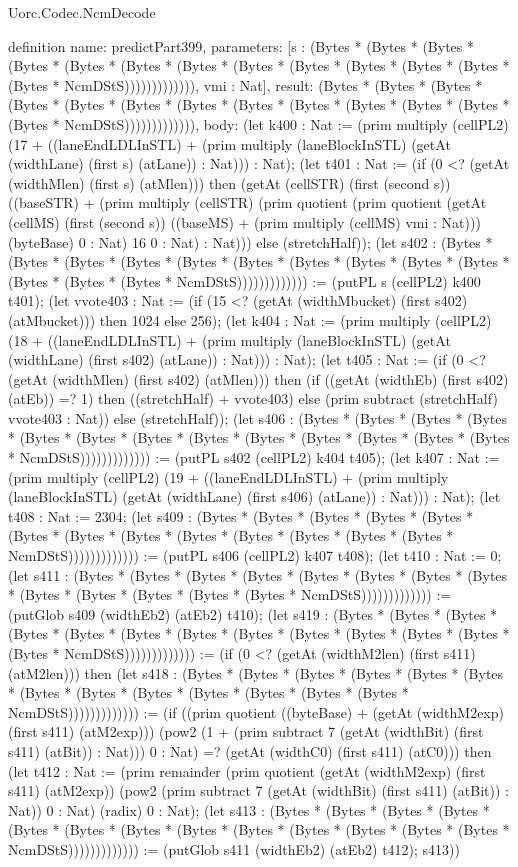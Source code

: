 \begin{lexlean}{Uorc.Codec.NcmDecode}
\begin{semanticmodule}
definition{
  name: predictPart399,
  parameters: [s : (Bytes * (Bytes * (Bytes * (Bytes * (Bytes * (Bytes * (Bytes * (Bytes * (Bytes * (Bytes * (Bytes * (Bytes * (Bytes * NcmDStS))))))))))))), vmi : Nat],
  result: (Bytes * (Bytes * (Bytes * (Bytes * (Bytes * (Bytes * (Bytes * (Bytes * (Bytes * (Bytes * (Bytes * (Bytes * (Bytes * NcmDStS))))))))))))),
  body: (let k400 : Nat := (prim multiply (cellPL2) (17 + ((laneEndLDLInSTL) + (prim multiply (laneBlockInSTL) (getAt (widthLane) (first s) (atLane)) : Nat))) : Nat); (let t401 : Nat := (if (0 <? (getAt (widthMlen) (first s) (atMlen))) then (getAt (cellSTR) (first (second s)) ((baseSTR) + (prim multiply (cellSTR) (prim quotient (prim quotient (getAt (cellMS) (first (second s)) ((baseMS) + (prim multiply (cellMS) vmi : Nat))) (byteBase) 0 : Nat) 16 0 : Nat) : Nat))) else (stretchHalf)); (let s402 : (Bytes * (Bytes * (Bytes * (Bytes * (Bytes * (Bytes * (Bytes * (Bytes * (Bytes * (Bytes * (Bytes * (Bytes * (Bytes * NcmDStS))))))))))))) := (putPL s (cellPL2) k400 t401); (let vvote403 : Nat := (if (15 <? (getAt (widthMbucket) (first s402) (atMbucket))) then 1024 else 256); (let k404 : Nat := (prim multiply (cellPL2) (18 + ((laneEndLDLInSTL) + (prim multiply (laneBlockInSTL) (getAt (widthLane) (first s402) (atLane)) : Nat))) : Nat); (let t405 : Nat := (if (0 <? (getAt (widthMlen) (first s402) (atMlen))) then (if ((getAt (widthEb) (first s402) (atEb)) =? 1) then ((stretchHalf) + vvote403) else (prim subtract (stretchHalf) vvote403 : Nat)) else (stretchHalf)); (let s406 : (Bytes * (Bytes * (Bytes * (Bytes * (Bytes * (Bytes * (Bytes * (Bytes * (Bytes * (Bytes * (Bytes * (Bytes * (Bytes * NcmDStS))))))))))))) := (putPL s402 (cellPL2) k404 t405); (let k407 : Nat := (prim multiply (cellPL2) (19 + ((laneEndLDLInSTL) + (prim multiply (laneBlockInSTL) (getAt (widthLane) (first s406) (atLane)) : Nat))) : Nat); (let t408 : Nat := 2304; (let s409 : (Bytes * (Bytes * (Bytes * (Bytes * (Bytes * (Bytes * (Bytes * (Bytes * (Bytes * (Bytes * (Bytes * (Bytes * (Bytes * NcmDStS))))))))))))) := (putPL s406 (cellPL2) k407 t408); (let t410 : Nat := 0; (let s411 : (Bytes * (Bytes * (Bytes * (Bytes * (Bytes * (Bytes * (Bytes * (Bytes * (Bytes * (Bytes * (Bytes * (Bytes * (Bytes * NcmDStS))))))))))))) := (putGlob s409 (widthEb2) (atEb2) t410); (let s419 : (Bytes * (Bytes * (Bytes * (Bytes * (Bytes * (Bytes * (Bytes * (Bytes * (Bytes * (Bytes * (Bytes * (Bytes * (Bytes * NcmDStS))))))))))))) := (if (0 <? (getAt (widthM2len) (first s411) (atM2len))) then (let s418 : (Bytes * (Bytes * (Bytes * (Bytes * (Bytes * (Bytes * (Bytes * (Bytes * (Bytes * (Bytes * (Bytes * (Bytes * (Bytes * NcmDStS))))))))))))) := (if ((prim quotient ((byteBase) + (getAt (widthM2exp) (first s411) (atM2exp))) (pow2 (1 + (prim subtract 7 (getAt (widthBit) (first s411) (atBit)) : Nat))) 0 : Nat) =? (getAt (widthC0) (first s411) (atC0))) then (let t412 : Nat := (prim remainder (prim quotient (getAt (widthM2exp) (first s411) (atM2exp)) (pow2 (prim subtract 7 (getAt (widthBit) (first s411) (atBit)) : Nat)) 0 : Nat) (radix) 0 : Nat); (let s413 : (Bytes * (Bytes * (Bytes * (Bytes * (Bytes * (Bytes * (Bytes * (Bytes * (Bytes * (Bytes * (Bytes * (Bytes * (Bytes * NcmDStS))))))))))))) := (putGlob s411 (widthEb2) (atEb2) t412); s413)) }
\end{semanticmodule}
\end{lexlean}
